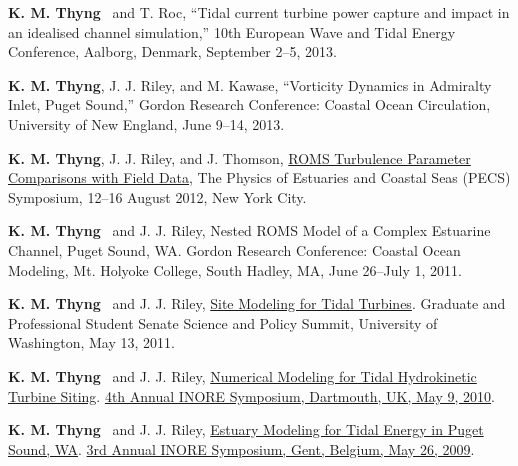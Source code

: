 \documentclass[10pt,letterpaper]{article}
\newcommand{\kmt}{\textbf{K. M. Thyng}}
\renewenvironment{itemize}{
  \begin{list}{}{
    \setlength{\leftmargin}{1.5em}
    \setlength{\itemsep}{0.25em}
    \setlength{\parskip}{0pt}
    \setlength{\parsep}{0.25em}
  }
}{
  \end{list}
}
\begin{document}
\begin{itemize}
\item \kmt~ and T. Roc, ``Tidal current turbine power capture and impact in an idealised channel simulation,'' 10th European Wave and Tidal Energy Conference, Aalborg, Denmark, September 2--5, 2013.

\item \kmt, J. J. Riley, and M. Kawase, ``Vorticity Dynamics in Admiralty Inlet, Puget Sound,'' Gordon Research Conference: Coastal Ocean Circulation, University of New England, June 9--14, 2013.

\item \kmt, J. J. Riley, and J. Thomson, \href{http://pong.tamu.edu/~kthyng/posters/pecs.pdf}{ROMS Turbulence Parameter Comparisons with Field Data}, The Physics of Estuaries and Coastal Seas (PECS) Symposium, 12--16 August 2012, New York City.

\item \kmt~ and J. J. Riley, Nested ROMS Model of a Complex Estuarine Channel, Puget Sound, WA. Gordon Research Conference: Coastal Ocean Modeling,
  Mt. Holyoke College, South Hadley,  MA,
  June 26--July 1, 2011.

\item \kmt~ and J. J. Riley, \href{http://froude.me.washington.edu/presentations/GPSS051311.pdf}{Site Modeling for Tidal Turbines}. Graduate and Professional Student Senate Science and Policy Summit, University of Washington, May 13, 2011.

\item \kmt~ and J. J. Riley, \href{http://froude.me.washington.edu/presentations/InorePoster2010/inore.pdf}{Numerical Modeling for Tidal
Hydrokinetic Turbine Siting}. \href{http://www.inore.org}{4th Annual INORE Symposium, Dartmouth, UK, May 9, 2010}.

\item \kmt~ and J. J. Riley, \href{http://froude.me.washington.edu/presentations/inore_poster2009.pdf}{Estuary Modeling for Tidal Energy in Puget Sound, WA}. \href{http://www.inore.org}{3rd Annual INORE Symposium, Gent, Belgium, May 26, 2009}.

\end{itemize}
\end{document}
